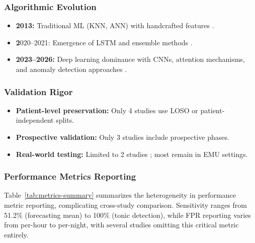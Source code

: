 \subsubsection{Algorithmic Evolution}
\begin{itemize}
  \item \textbf{2013:} Traditional ML (KNN, ANN) with handcrafted features \parencite{borujenyDetectionEpilepticSeizure2013}.
  \item \textbf2020--2021: Emergence of LSTM and ensemble methods \parencite{meiselMachineLearningWristband2020,stirlingForecastingSeizureLikelihood2021}.
  \item \textbf{2023--2026:} Deep learning dominance with CNNs, attention mechanisms, and anomaly detection approaches \parencite{reintjesECGBasedDetectionEpileptic2025,odeDevelopmentEpilepticSeizure2023,spahrDeepLearningbasedDetection2025}.
\end{itemize}

\subsubsection{Validation Rigor}
\begin{itemize}
  \item \textbf{Patient-level preservation:} Only 4 studies use LOSO or patient-independent splits.
  \item \textbf{Prospective validation:} Only 3 studies \parencite{spahrDeepLearningbasedDetection2025,dongTwoLayerEnsembleMethod2022,elemamAutomatedValidatedTool2025} include prospective phases.
  \item \textbf{Real-world testing:} Limited to 2 studies \parencite{vielufSeizureMonitoringCombined2025,nasseriAmbulatorySeizureForecasting2021}; most remain in EMU settings.
\end{itemize}

\subsubsection{Performance Metrics Reporting}
Table~\ref{tab:metrics-summary} summarizes the heterogeneity in performance metric reporting, complicating cross-study comparison. Sensitivity ranges from 51.2\% (forecasting mean) to 100\% (tonic detection), while FPR reporting varies from per-hour to per-night, with several studies omitting this critical metric entirely.

